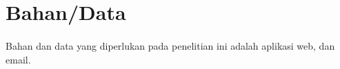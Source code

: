 \documentclass[./bab_3.tex]{subfiles}
\begin{document}
  \section{Bahan/Data}
  \paragraph*{}Bahan dan data yang diperlukan pada
  penelitian ini adalah aplikasi web, dan email.
\end{document}
